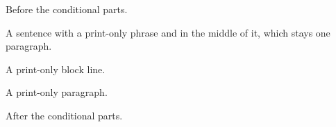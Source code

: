 Before the conditional parts.

A sentence with a print-only phrase and  in the middle of it, which stays one paragraph.

A print-only block line.

A print-only paragraph.

After the conditional parts.

